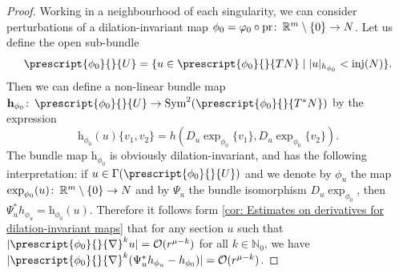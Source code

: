 \documentclass{article}
\numberwithin{equation}{section}        %
\theoremstyle{bfnote}
\theoremstyle{definition}
\theoremstyle{bfremark}
\newcommand{\col}{\colon \thinspace}        %
\newcommand{\N}{\mathbb{N}}                 %
\newcommand{\R}{\mathbb{R}}                 %
\newcommand{\pr}{\mathrm{pr}}               %
\newcommand{\bmap}[1]{\boldsymbol{\mathrm{#1}}}     %
\DeclareMathOperator{\inj}{inj}                 %
\begin{document}
\begin{proof}
    Working in a neighbourhood of each singularity, we can consider perturbations of a dilation-invariant map $\phi_0 = \varphi_0 \circ \pr \col \R^m \setminus \{0\} \to N$. Let us define the open sub-bundle 
    \begin{equation*}
        \prescript{\phi_0}{}{U} = \{ u \in \prescript{\phi_0}{}{TN} \mid |u|_{h_{\phi_0}} < \inj(N) \}.
    \end{equation*}
    Then we can define a non-linear bundle map $\bmap{h}_{\phi_0} \col \prescript{\phi_0}{}{U} \to \mathrm{Sym}^2 (\prescript{\phi_0}{}{T^*N})$ by the expression
    \begin{equation*}
        \bmap{h}_{\phi_0}(u) \{v_1,v_2\} = h(D_u \exp_{\phi_0}\{v_1\}, D_u\exp_{\phi_0} \{v_2\}) .
    \end{equation*}
    The bundle map $\bmap{h}_{\phi_0}$ is obviously dilation-invariant, and has the following interpretation: if $u \in \Gamma(\prescript{\phi_0}{}{U})$ and we denote by $\phi_u$ the map $\exp_{\phi_0}(u) \col \R^{m} \setminus \{0\} \to N$ and by $\Psi_u$ the bundle isomorphism $D_u \exp_{\phi_0}$, then $\Psi^*_u h_{\phi_u} = \bmap{h}_{\phi_0}(u)$. Therefore it follows form \cref{cor: Estimates on derivatives for dilation-invariant maps} that for any section $u$ such that $|\prescript{\phi_0}{}{\nabla}^k u| = \mathcal{O}(r^{\mu-k})$ for all $k \in \N_0$, we have $|\prescript{\phi_0}{}{\nabla}^k(\Psi_u^*h_{\phi_u}-h_{\phi_0})| = \mathcal{O}(r^{\mu-k})$. 
    

\end{proof}
\end{document}
